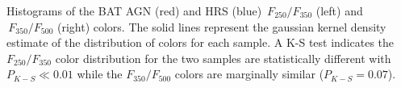 \label{fig:hist_250_350_color} Histograms of the BAT AGN (red) and HRS (blue) $\,F_{250}/F_{350}$ (left) and  $\,F_{350}/F_{500}$ (right) colors. The solid lines represent the gaussian kernel density estimate of the distribution of colors for each sample. A K-S test indicates the $F_{250}/F_{350}$ color distribution for the two samples are statistically different with $P_{K-S} \ll 0.01$ while the $F_{350}/F_{500}$ colors are marginally similar ($P_{K-S} = 0.07$).